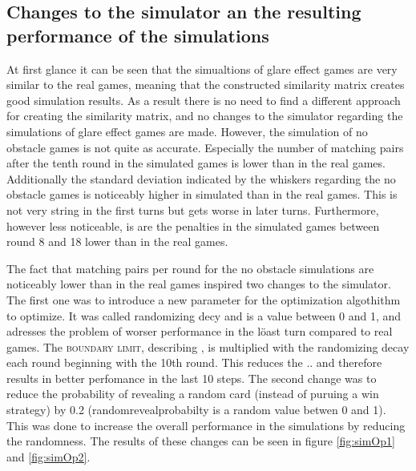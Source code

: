 \subsection{Changes to the simulator an the resulting performance of the simulations}
At first glance it can be seen that the simualtions of glare effect games are very similar to the real games, meaning that the constructed similarity matrix creates good simulation results. As a result there is no need to find a different approach for creating the similarity matrix, and no changes to the simulator regarding the simulations of glare effect games are made. However, the simulation of no obstacle games is not quite as accurate. Especially the number of matching pairs after the tenth round in the simulated games is lower than in the real games. Additionally the standard deviation indicated by the whiskers regarding the no obstacle games is noticeably higher in simulated than in the real games. This is not very string in the first turns but gets worse in later turns. Furthermore, however less noticeable, is are the penalties in the simulated games between round 8 and 18 lower than in the real games.

The fact that matching pairs per round for the no obstacle simulations are noticeably lower than in the real games inspired two changes to the simulator. The first one was to introduce a new parameter for the optimization algothithm to optimize. It was called randomizing decy and is a value between 0 and 1, and adresses the problem of worser performance in the löast turn compared to real games. The \textsc{boundary limit}, describing , is multiplied with the randomizing decay each round beginning with the 10th round. This reduces the .. and therefore results in better perfomance in the last 10 steps. The second change was to reduce the probability of revealing a random card (instead of puruing a win strategy) by 0.2 (randomrevealprobabilty is a random value betwen 0 and 1). This was done to increase the overall performance in the simulations by reducing the randomness. The results of these changes can be seen in figure \ref{fig:simOp1} and \ref{fig:simOp2}. 

